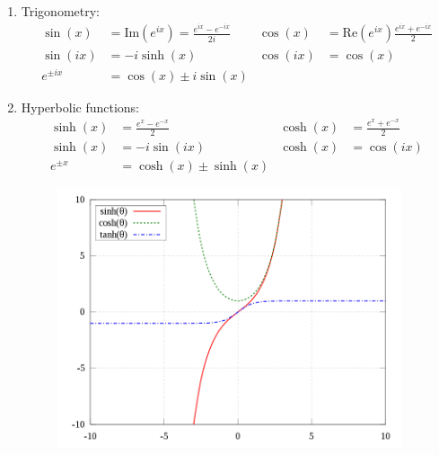 \documentclass{school-22.211-notes}
\begin{document}
\clearpage
{}
\begin{enumerate}
\item Trigonometry:
 \begin{align}
  \sin(x) &= \mathrm{Im}(e^{ix}) = \frac{e^{ix} - e^{-ix}}{2i} & \cos(x) &= \mathrm{Re}(e^{ix})\frac{e^{ix} + e^{-ix}}{2} \\
  \sin(ix) &= -i \sinh(x) & \cos(ix) &= \cos (x) \\
  e^{\pm ix} &= \cos(x) \pm i\sin(x) 
\end{align}


\item Hyperbolic functions:
\begin{align}
  \sinh(x) &= \frac{e^x - e^{-x}}{2} & \cosh(x) &= \frac{e^x + e^{-x}}{2} \\
  \sinh(x) &= -i \sin(ix) & \cosh(x) &= \cos (ix)  \\
  e^{\pm x} &= \cosh(x) \pm \sinh(x)
\end{align}

\begin{figure}[ht]
  \centering
  \includegraphics[width=4in]{images/dfs/sinh-cosh.png}
\end{figure}

\end{enumerate}
\end{document}
